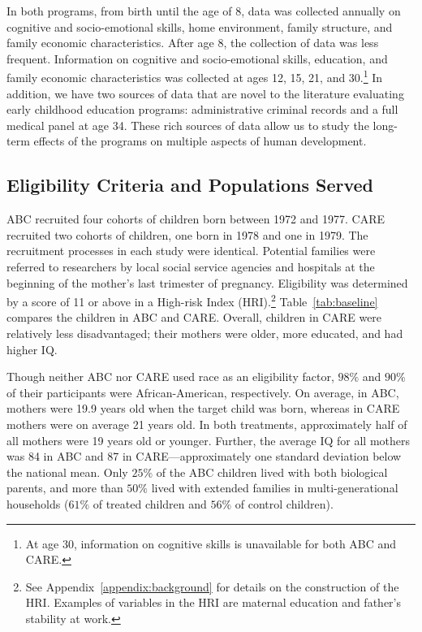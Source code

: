 \noindent In both programs, from birth until the age of 8, data was collected annually on cognitive and socio-emotional skills, home environment, family structure, and family economic characteristics. After age 8, the collection of data was less frequent. Information on cognitive and socio-emotional skills, education, and family economic characteristics was collected at ages 12, 15, 21, and 30.\footnote{At age 30, information on cognitive skills is unavailable for both ABC and CARE.} In addition, we have two sources of data that are novel to the literature evaluating early childhood education programs: administrative criminal records and a full medical panel at age 34. These rich sources of data allow us to study the long-term effects of the programs on multiple aspects of human development.

\subsection{Eligibility Criteria and Populations Served} \label{section:eligibility}

\noindent ABC recruited four cohorts of children born between 1972 and 1977. CARE recruited two cohorts of children, one born in 1978 and one in 1979. The recruitment processes in each study were identical. Potential families were referred to researchers by local social service agencies and hospitals at the beginning of the mother's last trimester of pregnancy. Eligibility was determined by a score of 11 or above in a High-risk Index (HRI).\footnote{See Appendix~\ref{appendix:background} for details on the construction of the HRI. Examples of variables in the HRI are maternal education and father's stability at work.} Table~\ref{tab:baseline} compares the children in ABC and CARE. Overall, children in CARE were relatively less disadvantaged; their mothers were older, more educated, and had higher IQ.



\noindent Though neither ABC nor CARE used race as an eligibility factor, $98\%$ and $90\%$ of their participants were African-American, respectively. On average, in ABC, mothers were 19.9 years old when the target child was born, whereas in CARE mothers were on average 21 years old. In both treatments, approximately half of all mothers were 19 years old or younger. Further, the average IQ for all mothers was 84 in ABC and 87 in CARE---approximately one standard deviation below the national mean. Only $25\%$ of the ABC children lived with both biological parents, and more than $50\%$ lived with extended families in multi-generational households ($61\%$ of treated children and $56\%$ of control children).\\


